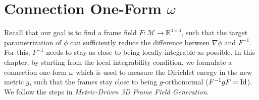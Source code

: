 \documentclass[../thesis.tex]{subfiles}
\begin{document}
\chapter{Connection One-Form $\omega$}
\label{ch:connection}

Recall that our goal is to find a frame field $F:\mathcal{M}\to \mathbb{R}^{3\times3}$,
such that the target parametrization of $\phi$ can sufficiently reduce
the difference between $\nabla \phi$ and $F^{-1}$.
For this, $F^{-1}$ needs to stay as close to being locally integrable
as possible. 
In this chapter, by starting from the local integrability condition,
we formulate a connection one-form $\omega$ which is used to
measure the Dirichlet energy in the new metric $g$, such that
the frames stay close to being $g$-orthonormal ($F^{-1}gF= \operatorname{Id}$).
We follow the steps in \emph{Metric-Driven 3D Frame Field Generation}\cite{Fang23}.
\end{document}
